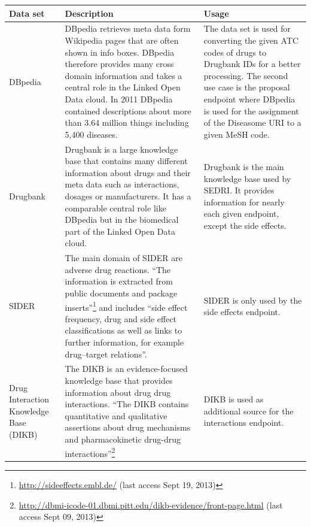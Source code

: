 
\begin{longtable}{p{}|p{}|p{}}
  Data set & Description & Usage\\
  \hline
  DBpedia & DBpedia retrieves meta data form Wikipedia pages that are often shown in info boxes. DBpedia therefore provides many cross domain information and takes a central role in the Linked Open Data cloud. In 2011 DBpedia contained descriptions about more than 3.64 million things including 5,400 diseases. & The data set is used for converting the given ATC codes of drugs to Drugbank IDs for a better processing. The second use case is the proposal endpoint where DBpedia is used for the assignment of the Diseasome URI to a given MeSH code.\\
  Drugbank & Drugbank is a large knowledge base that contains many different information about drugs and their meta data such as interactions, dosages or manufacturers. It has a comparable central role like DBpedia but in the biomedical part of the Linked Open Data cloud. & Drugbank is the main knowledge base used by SEDRI. It provides information for nearly each given endpoint, except the side effects.\\
  SIDER & The main domain of SIDER are adverse drug reactions. ``The information is extracted from public documents and package inserts''\footnote{\url{http://sideeffects.embl.de/} (last access Sept 19, 2013)} and includes ``side effect frequency, drug and side effect classifications as well as links to further information, for example drug–target relations''. & SIDER is only used by the side effects endpoint.\\
  Drug Interaction Knowledge Base (DIKB) & The DIKB is an evidence-focused knowledge base that provides information about drug drug interactions. ``The DIKB contains quantitative and qualitative assertions about drug mechanisms and pharmacokinetic drug-drug interactions''\footnote{\url{http://dbmi-icode-01.dbmi.pitt.edu/dikb-evidence/front-page.html} (last access Sept 09, 2013)} & DIKB is used as additional source for the interactions endpoint.\\

\end{longtable}
